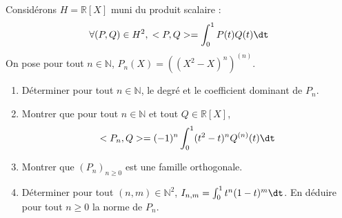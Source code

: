 \documentclass[a4paper,10pt]{report}
\begin{document}
\begin{Exa}[\ding{80}] Considérons $H= \mathbb{R}[X]$ muni du produit scalaire :
$$ \forall (P,Q) \in H^2, \; <P,Q> = \int_{0}^1 P(t) Q(t) \dt $$
On pose pour tout $n \in \mathbb{N}$, $P_n(X)= ((X^2-X)^n)^{(n)}$.

\begin{enumerate}
\item Déterminer pour tout $n \in \mathbb{N}$, le degré et le coefficient dominant de $P_n$.
\item Montrer que pour tout $n \in \mathbb{N}$ et tout $Q \in \mathbb{R}[X]$,
$$ <P_n,Q> = (-1)^n \int_{0}^1 (t^2-t)^n Q^{(n)}(t) \dt $$
\item Montrer que $(P_n)_{n \geq 0}$ est une famille orthogonale.
\item Déterminer pour tout $(n,m) \in \mathbb{N}^2$, $I_{n,m} = \int_{0}^1 t^n(1-t)^m \dt$. En déduire pour tout $n \geq 0$ la norme de $P_n$.
\end{enumerate}
\end{Exa}
\end{document}

